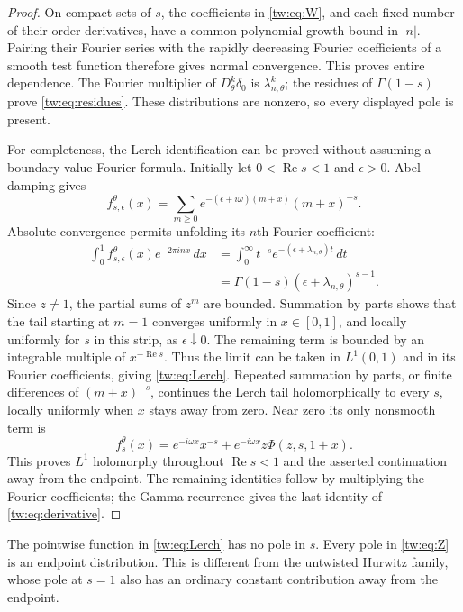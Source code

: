 \documentclass[11pt,letterpaper]{article}
\numberwithin{equation}{section}
\theoremstyle{plain}
\theoremstyle{definition}
\theoremstyle{remark}
\begin{document}
\begin{proof}
On compact sets of $s$, the coefficients in \eqref{tw:eq:W}, and each
fixed number of their order derivatives, have a common polynomial
growth bound in $|n|$. Pairing their Fourier series with the rapidly
decreasing Fourier coefficients of a smooth test function therefore
gives normal convergence. This proves entire dependence. The Fourier
multiplier of $D_\theta^k\delta_0$ is $\lambda_{n,\theta}^k$;
the residues of $\Gamma(1-s)$ prove \eqref{tw:eq:residues}. These
distributions are nonzero, so every displayed pole is present.

For completeness, the Lerch identification can be proved without
assuming a boundary-value Fourier formula. Initially let
$0<\operatorname{Re}s<1$ and $\epsilon>0$. Abel damping gives
\[
 f_{s,\epsilon}^\theta(x)
 =\sum_{m\ge0}e^{-(\epsilon+i\omega)(m+x)}(m+x)^{-s}.
\]
Absolute convergence permits unfolding its $n$th Fourier coefficient:
\begin{align*}
 \int_0^1 f_{s,\epsilon}^\theta(x)e^{-2\pi i n x}\,dx
 &=\int_0^\infty t^{-s}e^{-(\epsilon+\lambda_{n,\theta})t}\,dt\\
 &=\Gamma(1-s)(\epsilon+\lambda_{n,\theta})^{s-1}.
\end{align*}
Since $z\ne1$, the partial sums of $z^m$ are bounded. Summation by
parts shows that the tail starting at $m=1$ converges uniformly in
$x\in[0,1]$, and locally uniformly for $s$ in this strip, as
$\epsilon\downarrow0$. The remaining term is bounded by an integrable
multiple of $x^{-\operatorname{Re}s}$. Thus the limit can be taken in
$L^1(0,1)$ and in its Fourier coefficients, giving
\eqref{tw:eq:Lerch}. Repeated summation by parts, or finite differences
of $(m+x)^{-s}$, continues the Lerch tail holomorphically to every
$s$, locally uniformly when $x$ stays away from zero. Near zero its
only nonsmooth term is
\begin{equation}\label{tw:eq:localLerch}
 f_s^\theta(x)=e^{-i\omega x}x^{-s}
                +e^{-i\omega x}z\Phi(z,s,1+x).
\end{equation}
This proves $L^1$ holomorphy throughout $\operatorname{Re}s<1$ and
the asserted continuation away from the endpoint. The remaining
identities follow by multiplying the Fourier coefficients; the
Gamma recurrence gives the last identity of
\eqref{tw:eq:derivative}.
\end{proof}

The pointwise function in \eqref{tw:eq:Lerch} has no pole in $s$.
Every pole in \eqref{tw:eq:Z} is an endpoint distribution. This is
different from the untwisted Hurwitz family, whose pole at $s=1$
also has an ordinary constant contribution away from the endpoint.
\end{document}
